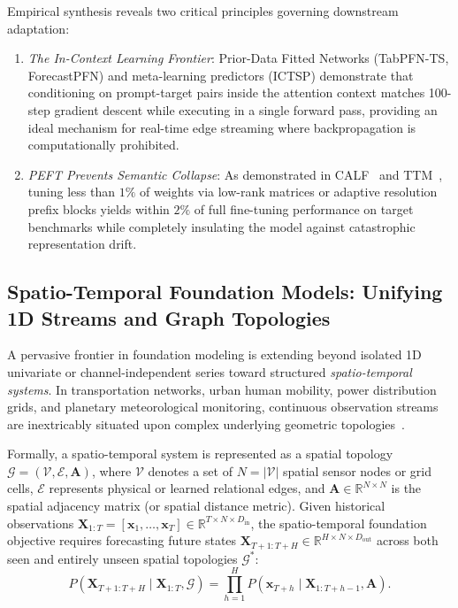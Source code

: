 Empirical synthesis reveals two critical principles governing downstream adaptation:
\begin{enumerate}[leftmargin=*]
    \item \emph{The In-Context Learning Frontier}: Prior-Data Fitted Networks (TabPFN-TS, ForecastPFN) and meta-learning predictors (ICTSP) demonstrate that conditioning on prompt-target pairs inside the attention context matches 100-step gradient descent while executing in a single forward pass, providing an ideal mechanism for real-time edge streaming where backpropagation is computationally prohibited.
    \item \emph{PEFT Prevents Semantic Collapse}: As demonstrated in CALF~\cite{liu2024calf} and TTM~\cite{ekambaram2024ttm}, tuning less than $1\%$ of weights via low-rank matrices or adaptive resolution prefix blocks yields within $2\%$ of full fine-tuning performance on target benchmarks while completely insulating the model against catastrophic representation drift.
\end{enumerate}

\subsection{Spatio-Temporal Foundation Models: Unifying 1D Streams and Graph Topologies}
\label{sec:spatiotemporal_foundation}

A pervasive frontier in foundation modeling is extending beyond isolated 1D univariate or channel-independent series toward structured \emph{spatio-temporal systems}. In transportation networks, urban human mobility, power distribution grids, and planetary meteorological monitoring, continuous observation streams are inextricably situated upon complex underlying geometric topologies~\cite{goodge2025stfmvision}.

Formally, a spatio-temporal system is represented as a spatial topology $\mathcal{G} = (\mathcal{V}, \mathcal{E}, \mathbf{A})$, where $\mathcal{V}$ denotes a set of $N = |\mathcal{V}|$ spatial sensor nodes or grid cells, $\mathcal{E}$ represents physical or learned relational edges, and $\mathbf{A} \in \mathbb{R}^{N \times N}$ is the spatial adjacency matrix (or spatial distance metric). Given historical observations $\mathbf{X}_{1:T} = [\mathbf{x}_1, \dots, \mathbf{x}_T] \in \mathbb{R}^{T \times N \times D_{\text{in}}}$, the spatio-temporal foundation objective requires forecasting future states $\mathbf{X}_{T+1:T+H} \in \mathbb{R}^{H \times N \times D_{\text{out}}}$ across both seen and entirely unseen spatial topologies $\mathcal{G}^*$:
\begin{equation}
    P(\mathbf{X}_{T+1:T+H} \mid \mathbf{X}_{1:T}, \mathcal{G}) = \prod_{h=1}^H P(\mathbf{x}_{T+h} \mid \mathbf{X}_{1:T+h-1}, \mathbf{A}).
\end{equation}

